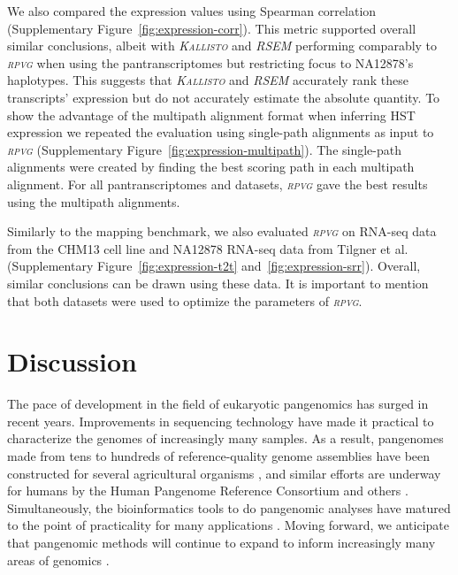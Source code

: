 \documentclass[11pt]{ucthesis}
\newcommand{\tool}[1]{\emph{\textsc{#1}}}
\begin{document}
We also compared the expression values using Spearman correlation (Supplementary Figure~\ref{fig:expression-corr}). This metric supported overall similar conclusions, albeit with \tool{Kallisto} and \tool{RSEM} performing comparably to \tool{rpvg} when using the pantranscriptomes but restricting focus to NA12878's haplotypes. This suggests that \tool{Kallisto} and \tool{RSEM} accurately rank these transcripts' expression but do not accurately estimate the absolute quantity.
\newline 
\newline
To show the advantage of the multipath alignment format when inferring HST expression we repeated the evaluation using single-path alignments as input to \tool{rpvg} (Supplementary Figure~\ref{fig:expression-multipath}). The single-path alignments were created by finding the best scoring path in each multipath alignment. For all pantranscriptomes and datasets, \tool{rpvg} gave the best results using the multipath alignments.

Similarly to the mapping benchmark, we also evaluated \tool{rpvg} on RNA-seq data from the CHM13 cell line and NA12878 RNA-seq data from Tilgner et al. \cite{tilgner2014defining} (Supplementary Figure~\ref{fig:expression-t2t} and~\ref{fig:expression-srr}). Overall, similar conclusions can be drawn using these data. It is important to mention that both datasets were used to optimize the parameters of \tool{rpvg}.

\section{Discussion}

The pace of development in the field of eukaryotic pangenomics has surged in recent years. Improvements in sequencing technology have made it practical to characterize the genomes of increasingly many samples. As a result, pangenomes made from tens to hundreds of reference-quality genome assemblies have been constructed for several agricultural organisms \cite{jayakodi2020barley,crysnanto2019accurate,liu2020pan}, and similar efforts are underway for humans by the Human Pangenome Reference Consortium and others \cite{ebert2021haplotype}. Simultaneously, the bioinformatics tools to do pangenomic analyses have matured to the point of practicality for many applications \cite{manuweera2019pangenome,hickey2020genotyping,siren2020genotyping}. Moving forward, we anticipate that pangenomic methods will continue to expand to inform increasingly many areas of genomics \cite{groza2020personalized}.
\end{document}
